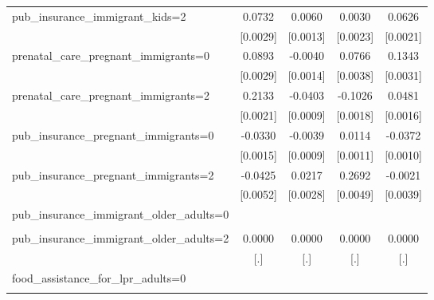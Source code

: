 \begin{table}[htbp]
\begin{tabular}{l*{4}{c}}
\addlinespace
pub\_insurance\_immigrant\_kids=2&      0.0732\sym{***}&      0.0060\sym{***}&      0.0030         &      0.0626\sym{***}\\
                    &    [0.0029]         &    [0.0013]         &    [0.0023]         &    [0.0021]         \\
\addlinespace
prenatal\_care\_pregnant\_immigrants=0&      0.0893\sym{***}&     -0.0040\sym{***}&      0.0766\sym{***}&      0.1343\sym{***}\\
                    &    [0.0029]         &    [0.0014]         &    [0.0038]         &    [0.0031]         \\
\addlinespace
prenatal\_care\_pregnant\_immigrants=2&      0.2133\sym{***}&     -0.0403\sym{***}&     -0.1026\sym{***}&      0.0481\sym{***}\\
                    &    [0.0021]         &    [0.0009]         &    [0.0018]         &    [0.0016]         \\
\addlinespace
pub\_insurance\_pregnant\_immigrants=0&     -0.0330\sym{***}&     -0.0039\sym{***}&      0.0114\sym{***}&     -0.0372\sym{***}\\
                    &    [0.0015]         &    [0.0009]         &    [0.0011]         &    [0.0010]         \\
\addlinespace
pub\_insurance\_pregnant\_immigrants=2&     -0.0425\sym{***}&      0.0217\sym{***}&      0.2692\sym{***}&     -0.0021         \\
                    &    [0.0052]         &    [0.0028]         &    [0.0049]         &    [0.0039]         \\
\addlinespace
pub\_insurance\_immigrant\_older\_adults=0&                     &                     &                     &                     \\
                    &                     &                     &                     &                     \\
\addlinespace
pub\_insurance\_immigrant\_older\_adults=2&      0.0000         &      0.0000         &      0.0000         &      0.0000         \\
                    &         [.]         &         [.]         &         [.]         &         [.]         \\
\addlinespace
food\_assistance\_for\_lpr\_adults=0&                     &                     &                     &                     \\
                    &                     &                     &                     &                     \\

\end{tabular}
\end{table}

